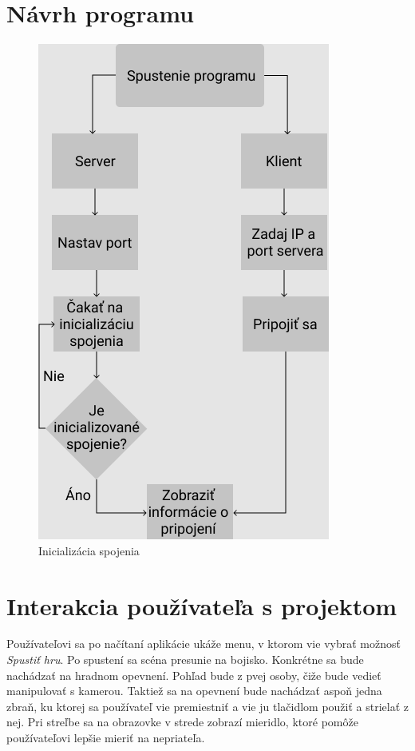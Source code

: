 \documentclass[12pt]{article}
\begin{document}
\section{Návrh programu}\label{program}
\begin{figure}[h!]
        \includegraphics[width=0.5\linewidth]{images/connection-init.png}
        \caption{Inicializácia spojenia}
        \label{fig:classDiagram}
\end{figure}

\section{Interakcia používateľa s projektom}\label{conclusions}
Používateľovi sa po načítaní aplikácie ukáže menu, v ktorom vie vybrať možnosť 
\textit{Spustiť hru}. Po spustení sa scéna presunie na bojisko. Konkrétne sa bude nachádzať 
na hradnom opevnení. Pohľad bude z pvej osoby, čiže bude vedieť manipulovať s kamerou. 
Taktiež sa na opevnení bude nachádzať aspoň jedna zbraň, ku ktorej sa používateľ vie 
premiestniť a vie ju tlačidlom použiť a strielať z nej. Pri streľbe sa na obrazovke v strede 
zobrazí mieridlo, ktoré pomôže používateľovi lepšie mieriť na nepriateľa.
\end{document}
